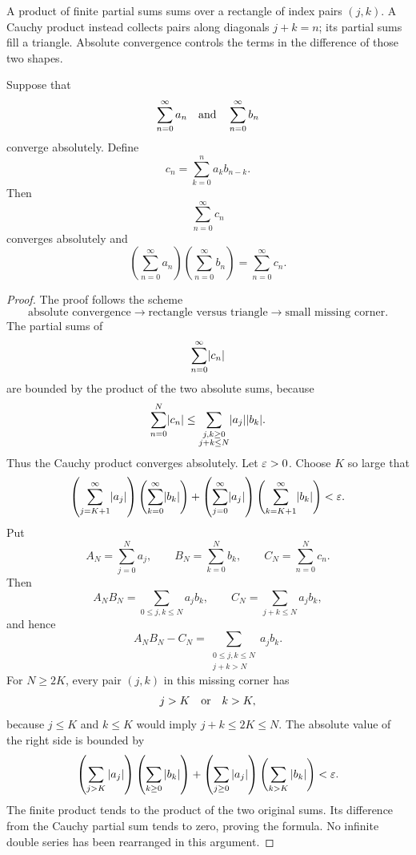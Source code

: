 A product of finite partial sums sums over a rectangle of index pairs
$(j,k)$. A Cauchy product instead collects pairs along diagonals $j+k=n$;
its partial sums fill a triangle. Absolute convergence controls the terms
in the difference of those two shapes.
\begin{center}
\end{center}
\begin{theorem}
\label{thm:cauchy-product}
Suppose that
\[
\sum_{n=0}^{\infty}a_n
\quad\hbox{and}\quad
\sum_{n=0}^{\infty}b_n
\]
converge absolutely. Define
\[
c_n=\sum_{k=0}^{n}a_kb_{n-k}.
\]
Then
\[
\sum_{n=0}^{\infty}c_n
\]
converges absolutely and
\[
\left(\sum_{n=0}^{\infty}a_n\right)
\left(\sum_{n=0}^{\infty}b_n\right)
=\sum_{n=0}^{\infty}c_n.
\]
\end{theorem}
\begin{proof}
The proof follows the scheme
\[
\boxed{\text{absolute convergence}
\longrightarrow\text{rectangle versus triangle}
\longrightarrow\text{small missing corner}.}
\]
The partial sums of
\[
\sum_{n=0}^{\infty}\lvert c_n\rvert
\]
are bounded by the product of the two absolute sums, because
\[
\sum_{n=0}^{N}\lvert c_n\rvert
\leq
\sum_{\substack{j,k\geq0\\j+k\leq N}}\lvert a_j\rvert\lvert b_k\rvert.
\]
Thus the Cauchy product converges absolutely. Let $\varepsilon>0$. Choose $K$ so large that
\[
\left(\sum_{j=K+1}^{\infty}\lvert a_j\rvert\right)
\left(\sum_{k=0}^{\infty}\lvert b_k\rvert\right)
+
\left(\sum_{j=0}^{\infty}\lvert a_j\rvert\right)
\left(\sum_{k=K+1}^{\infty}\lvert b_k\rvert\right)
<\varepsilon.
\]
Put
\[
A_N=\sum_{j=0}^Na_j,\qquad B_N=\sum_{k=0}^Nb_k,
\qquad C_N=\sum_{n=0}^Nc_n.
\]
Then
\[
A_NB_N=\sum_{0\leq j,k\leq N}a_jb_k,
\qquad
C_N=\sum_{j+k\leq N}a_jb_k,
\]
and hence
\[
A_NB_N-C_N
=\sum_{\substack{0\leq j,k\leq N\\j+k>N}}a_jb_k.
\]
For $N\geq2K$, every pair $(j,k)$ in this missing corner has
\[
 j>K\quad\hbox{or}\quad k>K,
\]
because $j\leq K$ and $k\leq K$ would imply $j+k\leq2K\leq N$.
The absolute value of the right side is bounded by
\[
\left(\sum_{j>K}|a_j|\right)\left(\sum_{k\geq0}|b_k|\right)
+\left(\sum_{j\geq0}|a_j|\right)\left(\sum_{k>K}|b_k|\right)<\varepsilon.
\]
The finite product tends to the product of the two original sums. Its
difference from the Cauchy partial sum tends to zero, proving the formula.
No infinite double series has been rearranged in this argument.
\end{proof}

